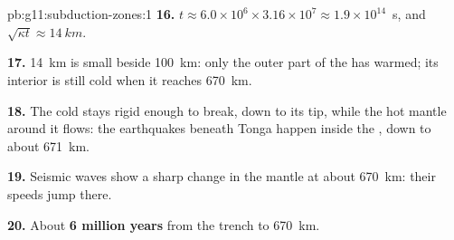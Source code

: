 \begin{solution}{pb:g11:subduction-zones:1}
\textbf{16.} $t \approx 6.0 \times 10^6 \times 3.16 \times 10^7 \approx
1.9 \times 10^{14}$~s, and $\sqrt{\kappa t} \approx \qty{14}{km}$.

\textbf{17.} \qty{14}{km} is small beside \qty{100}{km}: only the outer part
of the  has warmed; its interior is still cold when it reaches
\qty{670}{km}.

\textbf{18.} The cold  stays rigid enough to break, down to its tip,
while the hot mantle around it flows: the earthquakes beneath Tonga happen
inside the , down to about \qty{671}{km}.

\textbf{19.} Seismic waves show a sharp change in the mantle at about
\qty{670}{km}: their speeds jump there.

\textbf{20.} About \textbf{6 million years} from the trench to
\qty{670}{km}.
\end{solution}
